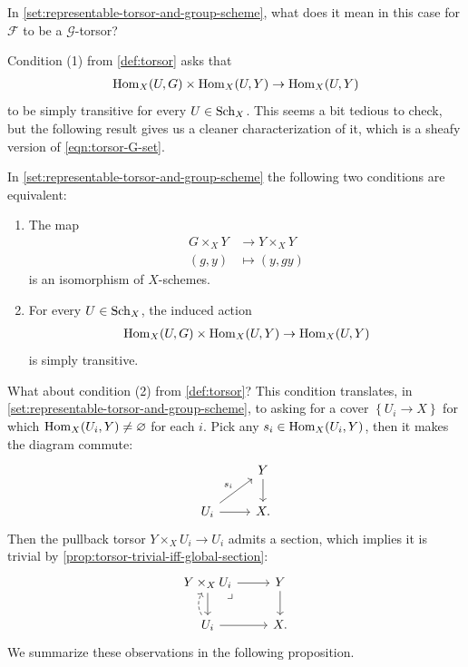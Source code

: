 \documentclass[11pt,openany]{book}
\begin{document}
\begin{question} In \autoref{set:representable-torsor-and-group-scheme}, what does it mean in this case for $\mathcal{F}$ to be a $\mathcal{G}$-torsor?
\end{question}

Condition (1) from \autoref{def:torsor} asks that
\begin{align*}
    \mathrm{Hom}_X(U,G) \times \mathrm{Hom}_X(U,Y) \to \mathrm{Hom}_X(U,Y)
\end{align*}
to be simply transitive for every $U\in \mathrm{Sch}_X$. This seems a bit tedious to check, but the following result gives us a cleaner characterization of it, which is a sheafy version of \autoref{eqn:torsor-G-set}.

\begin{proposition} \cite[0499]{Stacks} In \autoref{set:representable-torsor-and-group-scheme} the following two conditions are equivalent:
\begin{enumerate}
    \item The map
    \begin{align*}
        G \times_X Y &\to Y \times_X Y \\
        (g,y) &\mapsto (y,gy)
    \end{align*}
    is an isomorphism of $X$-schemes.
    
    \item For every $U \in \mathrm{Sch}_X$, the induced action
    \begin{align*}
        \mathrm{Hom}_X(U,G) \times \mathrm{Hom}_X(U,Y) \to \mathrm{Hom}_X(U,Y)
    \end{align*}
    is simply transitive.
\end{enumerate}
\end{proposition}

What about condition (2) from \autoref{def:torsor}? This condition translates, in \autoref{set:representable-torsor-and-group-scheme}, to asking for a cover $\left\{ U_i \to X \right\}$ for which $\mathrm{Hom}_X(U_i,Y)\ne \varnothing$ for each $i$. Pick any $s_i \in \mathrm{Hom}_X(U_i,Y)$, then it makes the diagram commute:
\[ \begin{tikzcd}
     & Y\dar\\
    U_i\rar\ar[ur,"s_i" above left] & X.
\end{tikzcd} \]
Then the pullback torsor $Y \times_X U_i \to U_i$ admits a section, which implies it is trivial by \autoref{prop:torsor-trivial-iff-global-section}:
\[ \begin{tikzcd}
    Y\times_X U_i\dar\rar\pb & Y\dar\\
    U_i\rar\uar[dashed,bend left=30] & X.
\end{tikzcd} \]
%
We summarize these observations in the following proposition.
\end{document}
